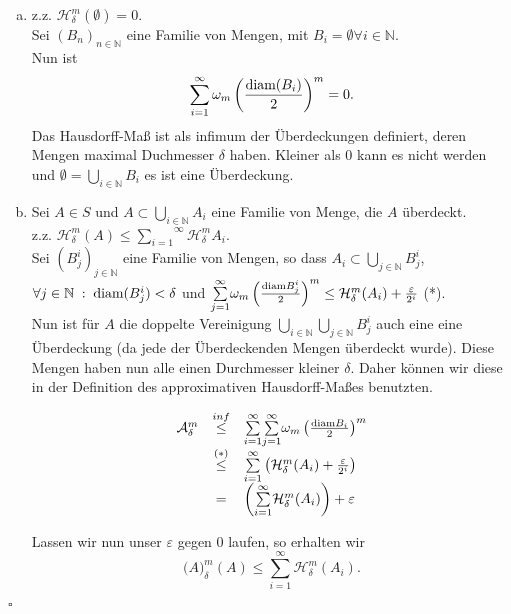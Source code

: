 \begin{enumerate}[a)]
    \item z.z. $\mathcal{H}^m_\delta (\emptyset) = 0$.\\
        Sei $(B_n)_{n \in \mathbb{N}}$ eine Familie von Mengen, mit $B_i = \emptyset \forall i \in \mathbb{N}$.\\
        Nun ist
        $$
            \sum^\infty_{i=1} \omega_m \left( \frac{\text{diam} (B_i)}{2} \right)^m = 0.
        $$
        Das Hausdorff-Maß ist als infimum der Überdeckungen definiert, deren Mengen maximal Duchmesser $\delta$ haben.
        Kleiner als $0$ kann es nicht werden und $\emptyset = \underset{i \in \mathbb{N}}{\bigcup} B_i$ es ist eine Überdeckung.

    \item Sei $A \in S$ und $A \subset \underset{i \in \mathbb{N}}{\bigcup} A_i$ eine Familie von Menge, die $A$ überdeckt.\\
        z.z. $\mathcal{H}^m_\delta (A) \leq \overset{\infty}{\underset{i=1}{\sum}} \mathcal{H}^m_\delta A_i$.\\

        Sei $(B^i_j)_{j \in \mathbb{N}}$ eine Familie von Mengen, so dass $ A_i \subset \underset{j \in \mathbb{N}}{\bigcup} B^i_j$,
        $\forall j \in \mathbb{N} \; : \; \text{diam} (B^i_j) < \delta$
        und $\overset{\infty}{\underset{j=1}{\sum}} \omega_m \left( \frac{\text{diam} B^i_j}{2} \right)^m \leq \mathcal{H}^m_\delta (A_i) + \frac{\varepsilon}{2^i}$ (*).\\

        Nun ist für $A$ die doppelte Vereinigung $\underset{i \in \mathbb{N}}{\bigcup} \underset{j \in \mathbb{N}}{\bigcup} B^i_j$ auch eine
        eine Überdeckung (da jede der Überdeckenden Mengen überdeckt wurde). Diese Mengen haben nun alle einen Durchmesser kleiner $\delta$. Daher
        können wir diese in der Definition des approximativen Hausdorff-Maßes benutzten.

        $$\begin{array}{rcl}
            \mathcal{A}^m_\delta &\stackrel{inf}{\leq}& \overset{\infty}{\underset{i=1}{\sum}} \overset{\infty}{\underset{j=1}{\sum}} \omega_m \left( \frac{\text{diam} B_i}{2} \right)^m\\
                &\stackrel{(*)}{\leq}& \overset{\infty}{\underset{i=1}{\sum}} \left( \mathcal{H}^m_\delta (A_i) + \frac{\varepsilon}{2^i} \right)\\
                &=& \left( \overset{\infty}{\underset{i=1}{\sum}} \mathcal{H}^m_\delta (A_i) \right) + \varepsilon
        \end{array}$$

        Lassen wir nun unser $\varepsilon$ gegen 0 laufen, so erhalten wir
        $$
            \mathcal(A)^m_\delta (A) \leq \overset{\infty}{\underset{i=1}{\sum}} \mathcal{H}^m_\delta (A_i).
        $$
\end{enumerate}
\mbox{} \hfill $\square$


